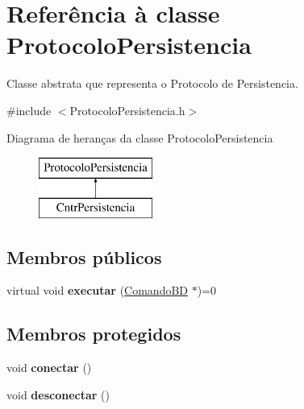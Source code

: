 \hypertarget{class_protocolo_persistencia}{
\section{\-Referência à classe \-Protocolo\-Persistencia}
\label{class_protocolo_persistencia}
}


\-Classe abstrata que representa o \-Protocolo de \-Persistencia.  




{\ttfamily \#include $<$\-Protocolo\-Persistencia.\-h$>$}

\-Diagrama de heranças da classe \-Protocolo\-Persistencia\begin{figure}[H]
\begin{center}
\leavevmode
\includegraphics[height=2.000000cm]{class_protocolo_persistencia}
\end{center}
\end{figure}
\subsection*{\-Membros públicos}
\begin{DoxyCompactItemize}
\item 
\hypertarget{class_protocolo_persistencia_a8c63bcd08e6a600b2ae1996acc173532}{
virtual void {\bfseries executar} (\hyperlink{class_comando_b_d}{\-Comando\-B\-D} $\ast$)=0}
\label{class_protocolo_persistencia_a8c63bcd08e6a600b2ae1996acc173532}

\end{DoxyCompactItemize}
\subsection*{\-Membros protegidos}
\begin{DoxyCompactItemize}
\item 
\hypertarget{class_protocolo_persistencia_a4b4202efbfdc63d62ff5bba02693cc5c}{
void {\bfseries conectar} ()}
\label{class_protocolo_persistencia_a4b4202efbfdc63d62ff5bba02693cc5c}

\item 
\hypertarget{class_protocolo_persistencia_a1cafadb01a6fa53286c8f7fbd1516269}{
void {\bfseries desconectar} ()}
\label{class_protocolo_persistencia_a1cafadb01a6fa53286c8f7fbd1516269}

\end{DoxyCompactItemize}


